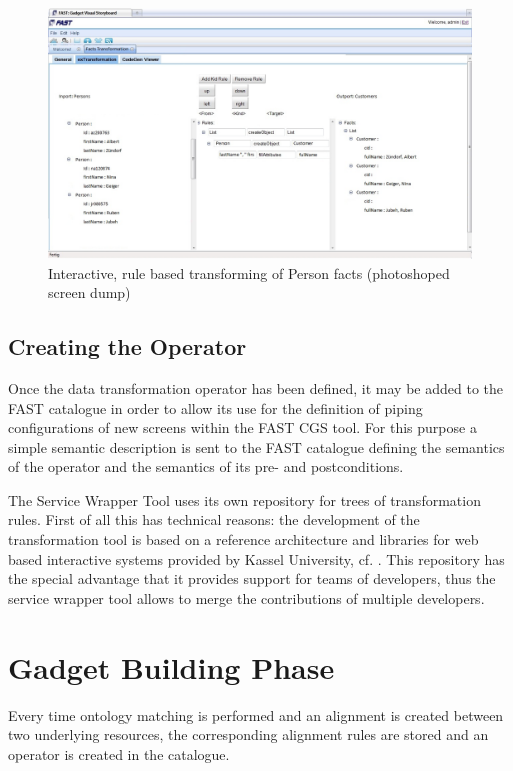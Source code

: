 \begin{figure}
  \begin{center}
\includegraphics[angle=90,width=0.8\linewidth]{images/FactsTransformationToolGVSWithTransformationRules.jpg}
    \caption{Interactive, rule based transforming of Person facts (photoshoped screen dump)}
    \label{fig:FactsTransformationToolTransformationRules}
  \end{center}
\end{figure}


\subsection{Creating the Operator}

Once the data transformation operator has been defined, it may be added to the FAST catalogue in order to allow its use for the definition of piping configurations of new screens within the FAST CGS tool. For this purpose a simple semantic description is sent to the FAST catalogue defining the semantics of the operator and the semantics of its pre- and postconditions.

The Service Wrapper Tool uses its own repository for trees of transformation rules. First of all this has technical reasons: the development of the transformation tool is based on a reference architecture and libraries for web based interactive systems provided by Kassel University, cf. \cite{AsDH2009CVSM}. This repository has the special advantage that it provides support for teams of developers, thus the service wrapper tool allows to merge the contributions of multiple developers. 


\section{Gadget Building Phase}
\label{sec:gadgetbuilding}
Every time ontology matching is performed and an alignment is created between two underlying resources, the corresponding alignment rules are stored and an operator is created in the catalogue. 

